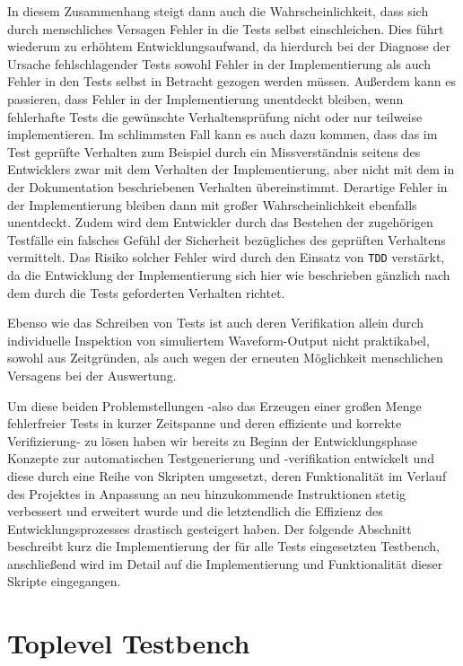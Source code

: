 \documentclass[ngerman, cd=lightcolor]{tudscrreprt}
\begin{document}
In diesem Zusammenhang steigt dann auch die Wahrscheinlichkeit, dass sich durch
menschliches Versagen Fehler in die Tests selbst einschleichen. Dies führt
wiederum zu erhöhtem Entwicklungsaufwand, da hierdurch bei der Diagnose der
Ursache fehlschlagender Tests sowohl Fehler in der Implementierung als auch
Fehler in den Tests selbst in Betracht gezogen werden müssen. Außerdem kann es
passieren, dass Fehler in der Implementierung unentdeckt bleiben, wenn
fehlerhafte Tests die gewünschte Verhaltensprüfung nicht oder nur teilweise
implementieren. Im schlimmsten Fall kann es auch dazu kommen, dass das im Test
geprüfte Verhalten zum Beispiel durch ein Missverständnis seitens des
Entwicklers zwar mit dem Verhalten der Implementierung, aber nicht mit dem in
der Dokumentation beschriebenen Verhalten übereinstimmt. Derartige Fehler in
der Implementierung bleiben dann mit großer Wahrscheinlichkeit ebenfalls
unentdeckt. Zudem wird dem Entwickler durch das Bestehen der zugehörigen
Testfälle ein falsches Gefühl der Sicherheit bezügliches des geprüften
Verhaltens vermittelt. Das Risiko solcher Fehler wird durch den Einsatz von
\texttt{TDD} verstärkt, da die Entwicklung der Implementierung sich hier wie
beschrieben gänzlich nach dem durch die Tests geforderten Verhalten richtet.

Ebenso wie das Schreiben von Tests ist auch deren Verifikation allein durch
individuelle Inspektion von simuliertem Waveform-Output nicht praktikabel,
sowohl aus Zeitgründen, als auch wegen der erneuten Möglichkeit menschlichen
Versagens bei der Auswertung.

Um diese beiden Problemstellungen -also das Erzeugen einer großen Menge
fehlerfreier Tests in kurzer Zeitspanne und deren effiziente und korrekte
Verifizierung- zu lösen haben wir bereits zu Beginn der Entwicklungsphase
Konzepte zur automatischen Testgenerierung und \mbox{-verifikation} entwickelt
und diese durch eine Reihe von Skripten umgesetzt, deren Funktionalität im
Verlauf des Projektes in Anpassung an neu hinzukommende Instruktionen stetig
verbessert und erweitert wurde und die letztendlich die Effizienz des
Entwicklungsprozesses drastisch gesteigert haben. Der folgende Abschnitt
beschreibt kurz die Implementierung der für alle Tests eingesetzten Testbench,
anschließend wird im Detail auf die Implementierung und Funktionalität dieser
Skripte eingegangen.

\section{Toplevel Testbench}
\end{document}
